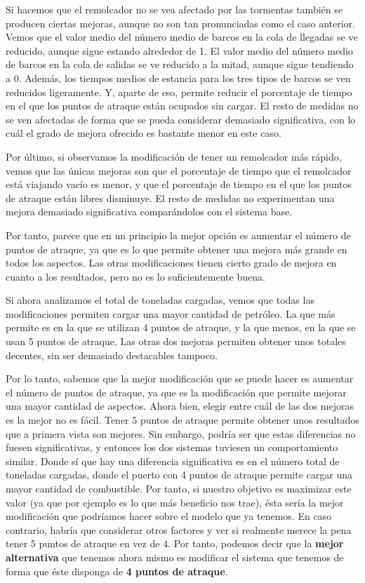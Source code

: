 \documentclass[11pt,a4paper]{article}
\begin{document}
Si hacemos que el remolcador no se vea afectado por las tormentas también se producen
ciertas mejoras, aunque no son tan pronunciadas como el caso anterior. Vemos que el
valor medio del número medio de barcos en la cola de llegadas se ve reducido, aunque
sigue estando alrededor de 1. El valor medio del número medio de barcos en la cola de
salidas se ve reducido a la mitad, aunque sigue tendiendo a 0. Además, los tiempos
medios de estancia para los tres tipos de barcos se ven reducidos ligeramente. Y,
aparte de eso, permite reducir el porcentaje de tiempo en el que los puntos de atraque
están ocupados sin cargar. El resto de medidas no se ven afectadas de forma que se
pueda considerar demasiado significativa, con lo cuál el grado de mejora ofrecido
es bastante menor en este caso.

Por último, si observamos la modificación de tener un remolcador más rápido, vemos que las
únicas mejoras son que el porcentaje de tiempo que el remolcador está viajando vacío
es menor, y que el porcentaje de tiempo en el que los puntos de atraque están libres
disminuye. El resto de medidas no experimentan una mejora demasiado significativa
comparándolos con el sistema base.

Por tanto, parece que en un principio la mejor opción es aumentar el número de puntos
de atraque, ya que es lo que permite obtener una mejora más grande en todos los
aspectos. Las otras modificaciones tienen cierto grado de mejora en cuanto a los
resultados, pero no es lo suficientemente buena.

Si ahora analizamos el total de toneladas cargadas, vemos que todas las modificaciones
permiten cargar una mayor cantidad de petróleo. La que más permite es en la que se utilizan
4 puntos de atraque, y la que menos, en la que se usan 5 puntos de atraque. Las otras
dos mejoras permiten obtener unos totales decentes, sin ser demasiado destacables
tampoco.

Por lo tanto, sabemos que la mejor modificación que se puede hacer es aumentar
el número de puntos de atraque, ya que es la modificación que permite mejorar
una mayor cantidad de aspectos. Ahora bien, elegir entre cuál de las dos mejoras
es la mejor no es fácil. Tener 5 puntos de atraque permite obtener unos resultados
que a primera vista son mejores. Sin embargo, podría ser que estas diferencias
no fuesen significativas, y entonces los dos sistemas tuviesen un comportamiento
similar. Donde sí que hay una diferencia significativa es en el número total de
toneladas cargadas, donde el puerto con 4 puntos de atraque permite cargar
una mayor cantidad de combustible. Por tanto, si nuestro objetivo es maximizar
este valor (ya que por ejemplo es lo que más beneficio nos trae), ésta sería
la mejor modificación que podríamos hacer sobre el modelo que ya tenemos. En caso
contrario, habría que considerar otros factores y ver si realmente merece la pena
tener 5 puntos de atraque en vez de 4. Por tanto, podemos decir que la \textbf{mejor
alternativa} que tenemos ahora mismo es modificar el sistema que tenemos
de forma que éste disponga de \textbf{4 puntos de atraque}.
\end{document}
